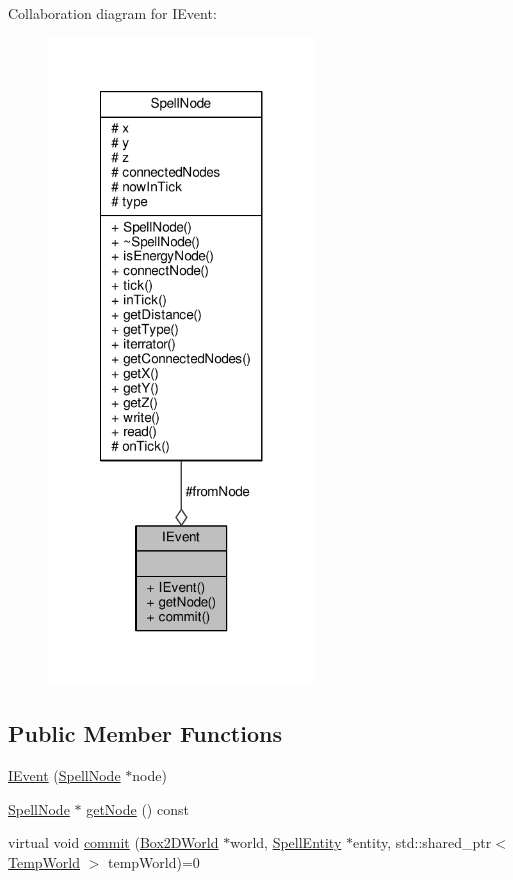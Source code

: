 Collaboration diagram for I\-Event\-:
\nopagebreak
\begin{figure}[H]
\begin{center}
\leavevmode
\includegraphics[width=200pt]{class_i_event__coll__graph}
\end{center}
\end{figure}
\subsection*{Public Member Functions}
\begin{DoxyCompactItemize}
\item 
\hyperlink{class_i_event_a47970d711c08bc2e097daa4c93810445}{I\-Event} (\hyperlink{class_spell_node}{Spell\-Node} $\ast$node)
\item 
\hyperlink{class_spell_node}{Spell\-Node} $\ast$ \hyperlink{class_i_event_aedde6835702a67a72e833b67230c5c66}{get\-Node} () const 
\item 
virtual void \hyperlink{class_i_event_a5422b83a412e52b68c7885b53a421e0e}{commit} (\hyperlink{class_box2_d_world}{Box2\-D\-World} $\ast$world, \hyperlink{class_spell_entity}{Spell\-Entity} $\ast$entity, std\-::shared\-\_\-ptr$<$ \hyperlink{_server_8hpp_ac147588bd69e1d052194e0dea10202ff}{Temp\-World} $>$ temp\-World)=0
\end{DoxyCompactItemize}
